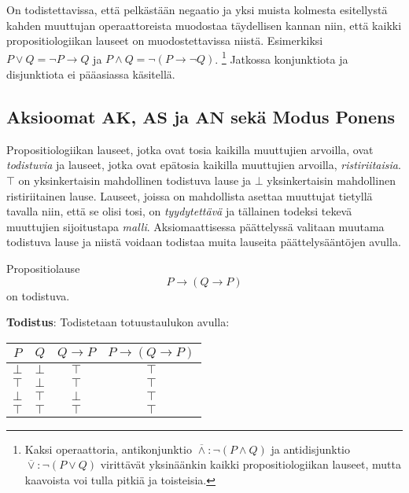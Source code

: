 \documentclass[a4paper,12pt]{amsart}
\begin{document}
On todistettavissa, että pelkästään negaatio ja yksi muista kolmesta esitellystä kahden muuttujan operaattoreista muodostaa täydellisen kannan niin, että kaikki propositiologiikan lauseet on muodostettavissa niistä. Esimerkiksi $P\lor Q=\lnot P\to Q$ ja $P\land Q=\lnot(P\to \lnot Q)$.
\footnote{Kaksi operaattoria, antikonjunktio $\overline\land: \lnot(P\land Q)$ ja antidisjunktio $\overline\lor: \lnot(P\lor Q)$ virittävät yksinäänkin kaikki propositiologiikan lauseet, mutta kaavoista voi tulla pitkiä ja toisteisia.}
Jatkossa konjunktiota ja disjunktiota ei pääasiassa käsitellä.
\subsection{Aksioomat $\mathbf{AK}$, $\mathbf{AS}$ ja $\mathbf{AN}$ sekä Modus Ponens}
Propositiologiikan lauseet, jotka ovat tosia kaikilla muuttujien arvoilla, ovat \emph{todistuvia} ja lauseet, jotka ovat epätosia kaikilla muuttujien arvoilla, \emph{ristiriitaisia}. $\top$ on yksinkertaisin mahdollinen todistuva lause ja $\bot$ yksinkertaisin mahdollinen ristiriitainen lause. Lauseet, joissa on mahdollista asettaa muuttujat tietyllä tavalla niin, että se olisi tosi, on \emph{tyydytettävä} ja tällainen todeksi tekevä muuttujien sijoitustapa \emph{malli}. Aksiomaattisessa päättelyssä valitaan muutama todistuva lause ja niistä voidaan todistaa muita lauseita päättelysääntöjen avulla.
\begin{lause}\label{ak}
Propositiolause
$$
P\to(Q\to P)
$$
on todistuva.

{\bf Todistus}: Todistetaan totuustaulukon avulla:

\begin{tabular}{c|c|c|c}
$P$ & $Q$ & $Q\to P$ & $P\to (Q\to P)$ \\
\hline
\hline
$\bot$ & $\bot$ & $\top$ & $\top$ \\
\hline
$\top$ & $\bot$ & $\top$ & $\top$ \\
\hline
$\bot$ & $\top$ & $\bot$ & $\top$ \\
\hline
$\top$ & $\top$ & $\top$ & $\top$ \\
\end{tabular}
\end{lause}
\end{document}
